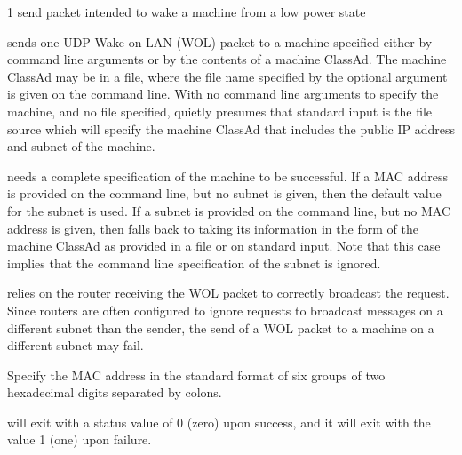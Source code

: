 \begin{ManPage}{\label{man-condor-power}}{1}
{send packet intended to wake a machine from a low power state}
\Synopsis 
{}




\Description

 sends one UDP Wake on LAN (WOL) packet to a machine
specified either by command line arguments or by the contents
of a machine ClassAd.
The machine ClassAd may be in a file, where the 
file name specified by the optional argument  
is given on the command line.
With no command line arguments to specify the machine,
and no file specified,  quietly presumes that standard input
is the file source which will
specify the machine ClassAd that includes the public IP address
and subnet of the machine.

 needs a complete specification of the machine to
be successful.
If a MAC address is provided on the command line, but no subnet is given,
then the default value for the subnet is used.
If a subnet is provided on the command line, but no MAC address is given,
then  falls back to taking its information in the form
of the machine ClassAd as provided in a file or on standard input.
Note that this case implies that the command line specification of the 
subnet is ignored.

 relies on the router receiving the WOL packet to correctly
broadcast the request. 
Since routers are often configured to ignore
requests to broadcast messages on a different subnet than the sender,
the send of a WOL packet to a machine on a different subnet may fail.

\begin{Options}
   {Specify the MAC address in the standard
    format of six groups of two hexadecimal digits separated by colons. }

\end{Options}

\ExitStatus

 will exit with a status value of 0 (zero) upon success,
and it will exit with the value 1 (one) upon failure.

\end{ManPage}
